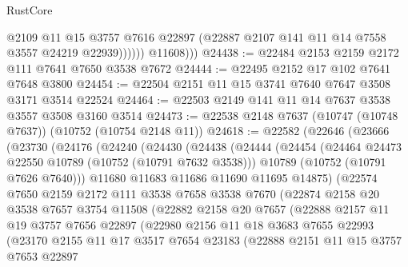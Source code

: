 \begin{lexlean}{RustCore}
\begin{coremodule}
                    @2109
                    @11
                    @15
                    @3757
                    @7616
                    @22897
                    (@22887 @2107 @141 @11 @14 @7558 @3557 @24219 @22939))))))
          @11608)))
@24438 := @22484 @2153 @2159 @2172 @111 @7641 @7650 @3538 @7672
@24444 := @22495 @2152 @17 @102 @7641 @7648 @3800
@24454 := @22504 @2151 @11 @15 @3741 @7640 @7647 @3508 @3171 @3514 @22524
@24464 := @22503 @2149 @141 @11 @14 @7637 @3538 @3557 @3508 @3160 @3514
@24473 := @22538 @2148 @7637 (@10747 (@10748 @7637)) (@10752 (@10754 @2148 @11))
@24618 := @22582
    (@22646
      (@23666
        (@23730
          (@24176
            (@24240
              (@24430
                (@24438
                  (@24444
                    (@24454
                      (@24464 @24473 @22550 @10789 (@10752 (@10791 @7632 @3538)))
                      @10789
                      (@10752 (@10791 @7626 @7640)))
                    @11680
                    @11683
                    @11686
                    @11690
                    @11695
                    @14875)
                  (@22574
                    @7650
                    @2159
                    @2172
                    @111
                    @3538
                    @7658
                    @3538
                    @7670
                    (@22874
                      @2158
                      @20
                      @3538
                      @7657
                      @3754
                      @11508
                      (@22882
                        @2158
                        @20
                        @7657
                        (@22888
                          @2157
                          @11
                          @19
                          @3757
                          @7656
                          @22897
                          (@22980
                            @2156
                            @11
                            @18
                            @3683
                            @7655
                            @22993
                            (@23170
                              @2155
                              @11
                              @17
                              @3517
                              @7654
                              @23183
                              (@22888
                                @2151
                                @11
                                @15
                                @3757
                                @7653
                                @22897

\end{coremodule}
\end{lexlean}
